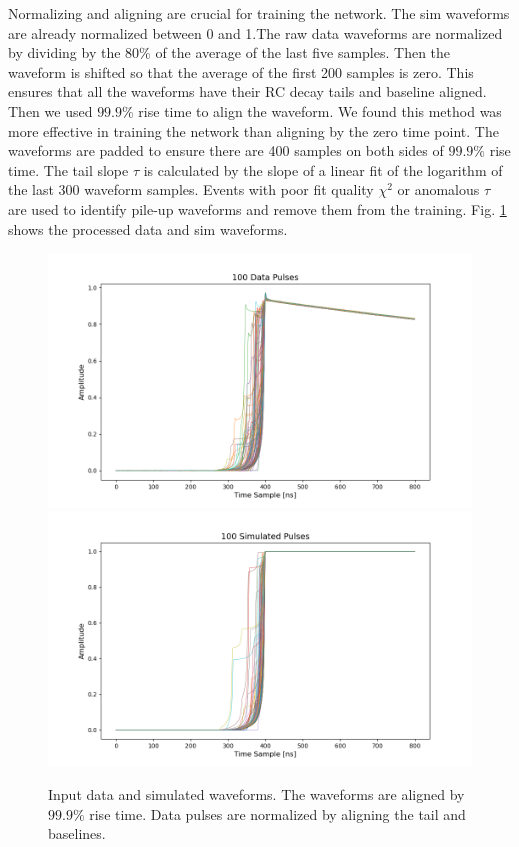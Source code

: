 Normalizing and aligning are crucial for training the network. The sim waveforms are already normalized between 0 and 1.The raw data waveforms are normalized by dividing by the $80\%$ of the average of the last five samples. Then the waveform is shifted so that the average of the first 200 samples is zero. This ensures that all the waveforms have their RC decay tails and baseline aligned. Then we used $99.9\%$ rise time to align the waveform. We found this method was more effective in training the network than aligning by the zero time point. The waveforms are padded to ensure there are 400 samples on both sides of $99.9\%$ rise time. The tail slope $\tau$ is calculated by the slope of a linear fit of the logarithm of the last 300 waveform samples. Events with poor fit quality $\chi^2$ or anomalous $\tau$ are used to identify pile-up waveforms and remove them from the training. Fig. \ref{ch7:figs:in_out} shows the processed data and sim waveforms.

\begin{figure}%
    \centering
    \includegraphics[width=0.9\linewidth,trim={4pc 0cm 6pc 1cm},clip]{ch7/figs/all_data_pulses.png}
    \includegraphics[width=0.9\linewidth,trim={4pc 0cm 6pc 1cm},clip]{ch7/figs/all_simulated_pulses.png}
    \caption{Input data and simulated waveforms. The waveforms are aligned by $99.9\%$ rise time. Data pulses are normalized by aligning the tail and baselines.}
   \label{ch7:figs:in_out}
\end{figure}

